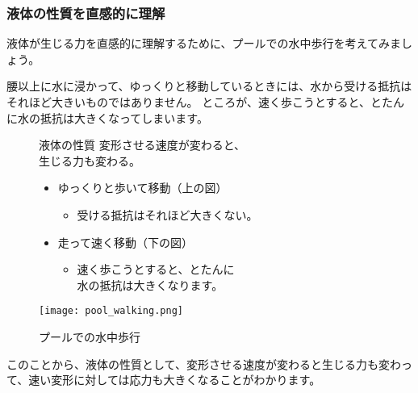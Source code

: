 \documentclass[uplatex,dvipdfmx,a4paper,11pt]{jsreport}
\begin{document}
\subsubsection{液体の性質を直感的に理解}

液体が生じる力を直感的に理解するために、プールでの水中歩行を考えてみましょう。

腰以上に水に浸かって、ゆっくりと移動しているときには、水から受ける抵抗はそれほど大きいものではありません。
ところが、速く歩こうとすると、とたんに水の抵抗は大きくなってしまいます。

\begin{figure}[htb]
	\begin{center}
		\begin{minipage}{0.55\textwidth}
			\large
			\begin{itembox}[l]{液体の性質}
				変形させる速度が変わると、\\生じる力も変わる。
				\begin{itemize}
					\item ゆっくりと歩いて移動（上の図）
					\begin{itemize}
						\item 受ける抵抗はそれほど大きくない。
					\end{itemize}
					\item 走って速く移動（下の図）
					\begin{itemize}
						\item 速く歩こうとすると、とたんに\\水の抵抗は大きくなります。
					\end{itemize}
				\end{itemize}
			\end{itembox}
		\end{minipage}
		\begin{minipage}{0.35\textwidth}
			\begin{center}
			\texttt{[image: pool\_walking.png]}
			\end{center}
		\end{minipage}
		\caption{プールでの水中歩行}
		\label{pool_walk}
	\end{center}
\end{figure}

このことから、液体の性質として、変形させる速度が変わると生じる力も変わって、速い変形に対しては応力も大きくなることがわかります。


\end{document}
